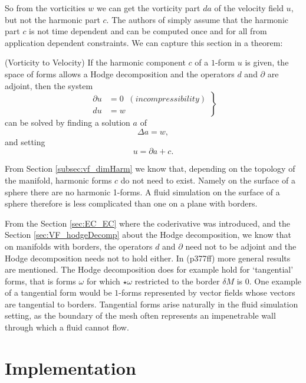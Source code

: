 So from the vorticities $w$ we can get the vorticity part $da$ of the velocity field $u$, but not the harmonic part $c$. The authors of \cite{simplicialFluids} simply assume that the harmonic part $c$ is not time dependent and can be computed once and for all from application dependent constraints. We can capture this section in a theorem:

\begin{thm} \label{thm:vort2vel}(Vorticity to Velocity) If the harmonic component $c$ of a $1$-form $u$ is given, the space of forms allows a Hodge decomposition and the operators $d$ and $\partial$ are adjoint, then the system
\begin{equation}\left.\begin{aligned}\partial u &= 0 \;\; (incompressibility) \\ 
du &= w \end{aligned}\right\}\end{equation}
can be solved by finding a solution $a$ of
\[\Delta a = w,\]
and setting
\[u = \partial a + c.\]
\end{thm}

From Section \ref{subsec:vf_dimHarm} we know that, depending on the topology of the manifold, harmonic forms $c$ do not need to exist. Namely on the surface of a sphere there are no harmonic 1-forms. A fluid simulation on the surface of a sphere therefore is less complicated than one on a plane with borders. 

From the Section \ref{sec:EC_EC} where the coderivative was introduced, and the Section \ref{sec:VF_hodgeDecomp} about the Hodge decomposition, we know that on manifolds with borders, the operators $d$ and $\partial$ need not to be adjoint and the Hodge decomposition needs not to hold either. In \cite{FRANKEL11} (p377ff) more general results are mentioned. The Hodge decomposition does for example hold for `tangential' forms, that is forms $\omega$ for which $\star\omega$ restricted to the border $\delta M$ is 0. One example of a tangential form would be $1$-forms represented by vector fields whose vectors are tangential to borders. Tangential forms arise naturally in the fluid simulation setting, as the boundary of the mesh often represents an impenetrable wall through which a fluid cannot flow.


\section{Implementation}
\label{sec:fd_implementation}

